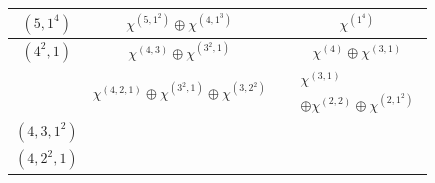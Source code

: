 \documentclass[11pt]{article}
\theoremstyle{definition}
\numberwithin{equation}{section}
\begin{document}
\begin{figure}[H]
\begin{tabular}{|c|c|c|c|}
		$(5,1^4)$ & $\chi^{(5,1^2)}\oplus \chi^{(4,1^3)}$ &\makecell{$\substack{  ( \chi^{(2,1)} \boxtimes \chi^{(3)})\\ \oplus (\chi^{(1^3)}\boxtimes \chi^{(3)})\oplus (\chi^{(2,1)} \boxtimes \chi^{(2,1)})}$}&
		$\chi^{(1^4)}$ \\ \hline
		$(4^2,1)$ & $\chi^{(4,3)}\oplus \chi^{(3^2,1)}$ &\makecell{$\substack{   (\chi^{(3)} \boxtimes \chi^{(2,1)})\\ \oplus (\chi^{(2,1)}\boxtimes \chi^{(2,1)})\oplus(\chi^{(3)}\boxtimes \chi^{(1^3)})}$}&$\chi^{(4)}\oplus \chi^{(3,1)}$
		\\ \hline
		\makecell{$(4,3,2)$ }& $\chi^{(4,2,1)}\oplus \chi^{(3^2,1)}\oplus \chi^{(3,2^2)}$ &\makecell{$\substack{  (\chi^{(3)}\boxtimes \chi^{(3)})\oplus (\chi^{(2,1)}\boxtimes \chi^{(3)}) \\ \oplus (\chi^{(3)} \boxtimes \chi^{(2,1)})  \oplus 2(\chi^{(2,1)}\boxtimes \chi^{(2,1)}) \\ \oplus(\chi^{(1^3)}\boxtimes \chi^{(2,1)}) \oplus ( \chi^{(2,1)}\boxtimes \chi^{(1^3)})}$}&
		$\substack{\chi^{(3,1)} \\ \oplus \chi^{(2,2)}\oplus \chi^{(2,1^2)}}$\\ \hline
		$(4,3,1^2)$ & \makecell{$\substack{ \chi^{(4,3)}\oplus \chi^{(4,2,1)} \\ \oplus \chi^{(3^2,1)}\oplus \chi^{(3,2,1^2)}}$} &
		\makecell{$\substack{  (\chi^{(2,1)}\boxtimes \chi^{(3)})\oplus (\chi^{(1^3)}\boxtimes \chi^{(3)})\\ \oplus 2(\chi^{(3)} \boxtimes \chi^{(2,1)})\oplus 3(\chi^{(2,1)}\boxtimes \chi^{(2,1)})\\
				\oplus(\chi^{(1^3)}\boxtimes \chi^{(2,1)}) \oplus ( \chi^{(3)}\boxtimes \chi^{(1^3)})\\ \oplus ( \chi^{(2,1)}\boxtimes \chi^{(1^3)})}$}
		&
		\makecell{$\substack{\chi^{(4)}\oplus 2\chi^{(3,1)} \\ \oplus  \chi^{(2,2)}\oplus \chi^{(2,1^2)}}$ }\\ \hline
		$(4,2^2,1)$ & \makecell{$\substack{ \chi^{(4,2,1)}\oplus \chi^{(4,1^3)} \\ \oplus \chi^{(3,2^2)}\oplus \chi^{(3,2,1^2)}}$ } &
		\makecell{$\substack{  (\chi^{(3)}\boxtimes \chi^{(3)}) \oplus 2 (\chi^{(2,1)}\boxtimes \chi^{(3)})\\ \oplus (\chi^{(1^3)}\boxtimes \chi^{(3)}) \oplus (\chi^{(3)} \boxtimes \chi^{(2,1)})\\ \oplus 3(\chi^{(2,1)}\boxtimes \chi^{(2,1)})
				\oplus2(\chi^{(1^3)}\boxtimes \chi^{(2,1)}) \\ \oplus ( \chi^{(2,1)}\boxtimes \chi^{(1^3)})\oplus ( \chi^{(1^3)}\boxtimes \chi^{(1^3)})}$}

\end{tabular}
\end{figure}
\end{document}
